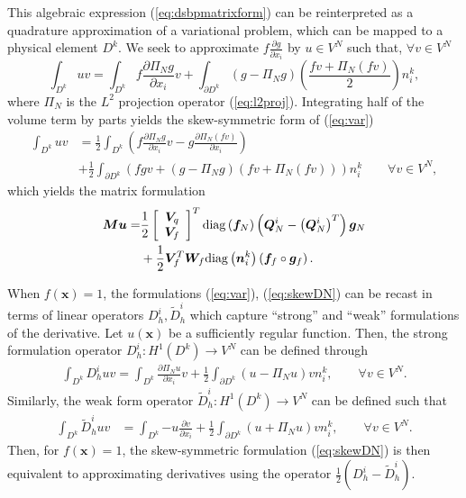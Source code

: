 \documentclass{svjour3}                     %
\renewcommand{\tilde}{\widetilde}
\newcommand{\diag}[1]{{\rm diag}\LRp{#1}}
\newcommand{\pd}[2]{\frac{\partial#1}{\partial#2}}
\newcommand{\LRp}[1]{\left( #1 \right)}
\newcommand{\LRs}[1]{\left[ #1 \right]}
\begin{document}
This algebraic expression (\ref{eq:dsbpmatrixform}) can be reinterpreted as a quadrature approximation of a variational problem, which can be mapped to a physical element $D^k$.  We seek to approximate $f\pd{g}{x_i}$ by $u \in V^N$ such that, $\forall v\in V^N$
\begin{equation}
\int_{D^k} u v = \int_{D^k} f\pd{\Pi_N g}{{x}_i}v + \int_{\partial {D}^k} \LRp{g - \Pi_Ng} \LRp{\frac{fv + \Pi_N(fv)}{2}} {n}^k_i,\label{eq:var}
\end{equation}
where $\Pi_N$ is the $L^2$ projection operator (\ref{eq:l2proj}).  
Integrating half of the volume term by parts yields the skew-symmetric form of (\ref{eq:var})
\begin{align}
\int_{D^k} u  v &=\frac{1}{2} \int_{{D^k}} \LRp{f\pd{\Pi_N g}{{x}_i}v - g \pd{\Pi_N\LRp{fv}}{{x}_i}} \label{eq:skewDN}\\
&+\frac{1}{2} \int_{\partial {D}^k} \LRp{fgv + \LRp{g - \Pi_Ng} \LRp{{fv + \Pi_N(fv)}{}}} {n}^k_i \qquad \forall v\in V^N\nonumber,
\end{align}
which yields the matrix formulation
\begin{align}
\bm{M}\bm{u} =& \frac{1}{2} \LRs{\begin{array}{c}
\bm{V}_q \\ \bm{V}_f\end{array}}^T \diag{\bm{f}_N}\LRp{\bm{Q}^i_N - \LRp{\bm{Q}^i_N}^T}\bm{g}_N \label{eq:dsbpmatrixform}\\
&+ \frac{1}{2}\bm{V}_f^T\bm{W}_f\diag{\bm{n}^k_i} \LRp{\bm{f}_f \circ \bm{g}_f}.\nonumber
\end{align}


When $f(\bm{x}) = 1$, the formulations (\ref{eq:var}), (\ref{eq:skewDN}) can be recast in terms of linear operators $D^i_h, \tilde{D}^i_h$ which capture ``strong'' and ``weak'' formulations of the derivative.  Let $u(\bm{x})$ be a sufficiently regular function.  Then, the strong formulation operator $D^i_h: H^1\LRp{D^k}\rightarrow V^N$ can be defined through
\begin{align*}
\int_{D^k} D^i_h u  v = \int_{D^k} \pd{\Pi_N u}{x_i}v + \frac{1}{2}\int_{\partial D^k} \LRp{u - \Pi_Nu} v {n}^k_i, \qquad \forall v\in V^N.
\end{align*}
Similarly, the weak form operator $\tilde{D}^i_h: H^1\LRp{D^k}\rightarrow V^N$ can be defined such that
\begin{align*}
\int_{D^k} \tilde{D}^i_hu v &= \int_{D^k} { -u \pd{{v}}{x_i}} + \frac{1}{2}\int_{\partial D^k}  \LRp{u+\Pi_N u} v {n}^k_i, \qquad \forall v\in V^N.
\end{align*}
Then, for $f(\bm{x}) = 1$, the skew-symmetric formulation (\ref{eq:skewDN}) is then equivalent to approximating derivatives using the operator $\frac{1}{2}\LRp{D^i_h - \tilde{D}^i_h}$.  
\end{document}
